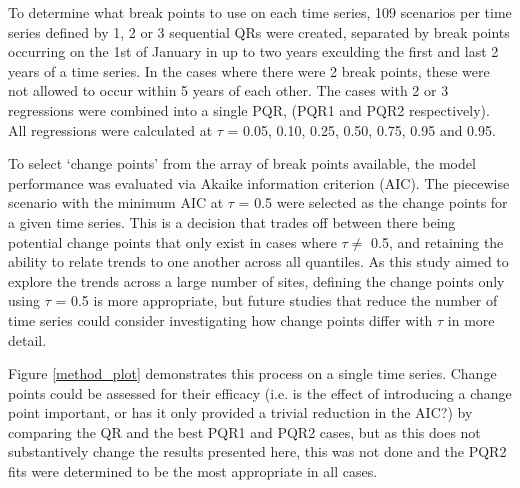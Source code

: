 \documentclass[journal abbreviation, manuscript]{copernicus}
\begin{document}
To determine what break points to use on each time series, 109 scenarios per time series defined by 1, 2 or 3 sequential QRs were created, separated by break points occurring on the 1st of January in up to two years exculding the first and last 2 years of a time series. In the cases where there were 2 break points, these were not allowed to occur within 5 years of each other. The cases with 2 or 3 regressions were combined into a single PQR, (PQR1 and PQR2 respectively). All regressions were calculated at $\tau$ = 0.05, 0.10, 0.25, 0.50, 0.75, 0.95 and 0.95.

To select ‘change points’ from the array of break points available, the model performance was evaluated via Akaike information criterion (AIC). The piecewise scenario with the minimum AIC at $\tau$ = 0.5 were selected as the change points for a given time series. This is a decision that  trades off between there being potential change points that only exist in cases where $\tau \neq$ 0.5, and retaining the ability to relate trends to one another across all quantiles. As this study aimed to explore the trends across a large number of sites, defining the change points only using $\tau$ = 0.5 is more appropriate, but future studies that reduce the number of time series could consider investigating how change points differ with $\tau$ in more detail.

Figure \ref{method_plot} demonstrates this process on a single time series. Change points could be assessed for their efficacy (i.e. is the effect of introducing a change point important, or has it only provided a trivial reduction in the AIC?) by comparing the QR and the best PQR1 and PQR2 cases, but as this does not substantively change the results presented here, this was not done and the PQR2 fits were determined to be the most appropriate in all cases.
\end{document}
